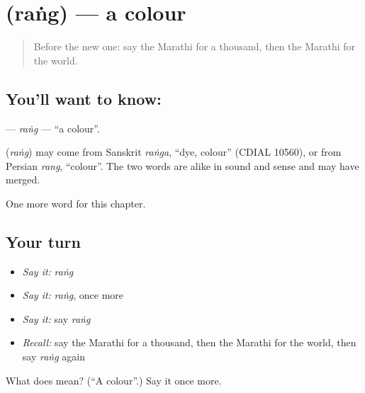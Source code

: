 \section[\texorpdfstring{\mr{रंग} (raṅg)}{रंग (raṅg)}]{ (raṅg) — a colour}

\label{lesson:MR-C119-rang}



\begin{quote}
Before the new one: say the Marathi for a thousand, then the Marathi for the world.
\end{quote}

\subsection*{You'll want to know: }
\textbf{} — \emph{raṅg} — \textquotedblleft{}a colour\textquotedblright{}.

\begin{cousinweb}
\textbf{} (\emph{raṅg}) may come from Sanskrit \emph{raṅga}, \textquotedblleft{}dye, colour\textquotedblright{} (CDIAL 10560), or from Persian \emph{rang}, \textquotedblleft{}colour\textquotedblright{}. The two words are alike in sound and sense and may have merged.
\end{cousinweb}

\begin{grammarlens}[title={What you've built}]
One more word for this chapter.
\end{grammarlens}

\subsection*{Your turn}
\begin{itemize}
\raggedright
  \item \emph{Say it:} \emph{raṅg}
  \item \emph{Say it:} \emph{raṅg}, once more
  \item \emph{Say it:} say \emph{raṅg}
  \item \emph{Recall:} say the Marathi for a thousand, then the Marathi for the world, then say \emph{raṅg} again
\end{itemize}

\begin{tcolorbox}[breakable,colback=teal!4,colframe=teal!35!black,title={Before you move on}]
What does  mean? (\textquotedblleft{}A colour\textquotedblright{}.) Say it once more.
\end{tcolorbox}
